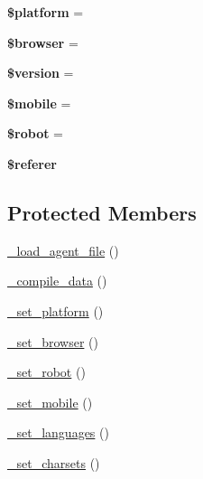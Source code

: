 \begin{DoxyCompactItemize}
{\bfseries \$platform} = \textquotesingle{}\textquotesingle{}
\item 
\mbox{\label{class_c_i___user__agent_ada6112ba48917a0c8cc154ed90908b28}} 
{\bfseries \$browser} = \textquotesingle{}\textquotesingle{}
\item 
\mbox{\label{class_c_i___user__agent_a17c8948c68aa44fa9961ae169b6a8961}} 
{\bfseries \$version} = \textquotesingle{}\textquotesingle{}
\item 
\mbox{\label{class_c_i___user__agent_a4144d0c9c54f204811328b221f06fc3d}} 
{\bfseries \$mobile} = \textquotesingle{}\textquotesingle{}
\item 
\mbox{\label{class_c_i___user__agent_aaf86508e45876d0081cadac4cb8a8808}} 
{\bfseries \$robot} = \textquotesingle{}\textquotesingle{}
\item 
\mbox{\label{class_c_i___user__agent_a872d93ddbbb879ab5c0eb29261a520a4}} 
{\bfseries \$referer}
\end{DoxyCompactItemize}
\subsection*{Protected Members}
\begin{DoxyCompactItemize}
\item 
\mbox{\hyperlink{class_c_i___user__agent_a96ec01490c667b47c5faec7cb53c34b2}{\+\_\+load\+\_\+agent\+\_\+file}} ()
\item 
\mbox{\hyperlink{class_c_i___user__agent_a4ced3acbcc2ab5e599f212c676590d06}{\+\_\+compile\+\_\+data}} ()
\item 
\mbox{\hyperlink{class_c_i___user__agent_a3e3af24bc0adb0483c3965765b28a25b}{\+\_\+set\+\_\+platform}} ()
\item 
\mbox{\hyperlink{class_c_i___user__agent_a6788d0353e44d81a1214fe367ebce0f5}{\+\_\+set\+\_\+browser}} ()
\item 
\mbox{\hyperlink{class_c_i___user__agent_a037f28a8a54578f57417d15fae820817}{\+\_\+set\+\_\+robot}} ()
\item 
\mbox{\hyperlink{class_c_i___user__agent_aa2b84face2c8bd1830f618bf9a57f196}{\+\_\+set\+\_\+mobile}} ()
\item 
\mbox{\hyperlink{class_c_i___user__agent_a14307e07c78ada7733b36660bce03db8}{\+\_\+set\+\_\+languages}} ()
\item 
\mbox{\hyperlink{class_c_i___user__agent_ae97780ac0ec104137f47641061288f3c}{\+\_\+set\+\_\+charsets}} ()
\end{DoxyCompactItemize}


